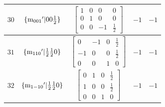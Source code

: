 \documentclass[fleqn,8pt]{jsarticle}
\begin{document}
\begin{longtable}{ccccc}
$ 30 $ & $ \{{\rm m}_{001}{}'|0 0 \frac{1}{2}\} $ & $ \begin{bmatrix} 1 & 0 & 0 & 0 \\ 0 & 1 & 0 & 0 \\ 0 & 0 & -1 & \frac{1}{2} \end{bmatrix} $ & $ -1 $ & $ -1 $ \\ \hline
$ 31 $ & $ \{{\rm m}_{110}{}'|\frac{1}{2} \frac{1}{2} 0\} $ & $ \begin{bmatrix} 0 & -1 & 0 & \frac{1}{2} \\ -1 & 0 & 0 & \frac{1}{2} \\ 0 & 0 & 1 & 0 \end{bmatrix} $ & $ -1 $ & $ -1 $ \\ \hline
$ 32 $ & $ \{{\rm m}_{1-10}{}'|\frac{1}{2} \frac{1}{2} 0\} $ & $ \begin{bmatrix} 0 & 1 & 0 & \frac{1}{2} \\ 1 & 0 & 0 & \frac{1}{2} \\ 0 & 0 & 1 & 0 \end{bmatrix} $ & $ -1 $ & $ -1 $ \\
\end{longtable}
\end{document}
